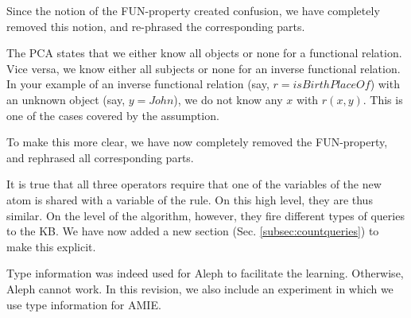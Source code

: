       Since the notion of the FUN-property created confusion, we have completely removed this notion, and re-phrased the corresponding parts.



The PCA states that we either know all objects or none for a functional relation. Vice versa, we know either all subjects or none for an inverse functional relation. In your example of an inverse functional relation (say, $r=isBirthPlaceOf$) with an unknown object (say, $y=John$), we do not know any $x$ with $r(x,y)$. This is one of the cases covered by the assumption.

To make this more clear, we have now completely removed the FUN-property, and rephrased all corresponding parts.



It is true that all three operators require that one of the variables of the new atom is shared with a variable of the rule. On this high level, they are thus similar. On the level of the algorithm, however, they fire different types of queries to the KB. We have now added a new section (Sec. \ref{subsec:countqueries}) to make this explicit.


      Type information was indeed used for Aleph to facilitate the learning. Otherwise, Aleph cannot work.
      In this revision, we also include an experiment in which we use type information for AMIE.

